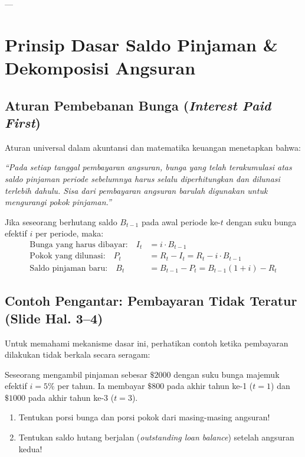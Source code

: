 \documentclass[11pt,a4paper]{article}
\begin{document}
---

\section{Prinsip Dasar Saldo Pinjaman \& Dekomposisi Angsuran}

\subsection{Aturan Pembebanan Bunga (\textit{Interest Paid First})}

Aturan universal dalam akuntansi dan matematika keuangan menetapkan bahwa:
\begin{center}
\textit{``Pada setiap tanggal pembayaran angsuran, bunga yang telah terakumulasi atas saldo pinjaman periode sebelumnya harus selalu diperhitungkan dan dilunasi terlebih dahulu. Sisa dari pembayaran angsuran barulah digunakan untuk mengurangi pokok pinjaman.''}
\end{center}
Jika seseorang berhutang saldo $B_{t-1}$ pada awal periode ke-$t$ dengan suku bunga efektif $i$ per periode, maka:
\begin{align}
    \text{Bunga yang harus dibayar:} \quad I_t &= i \cdot B_{t-1} \\
    \text{Pokok yang dilunasi:} \quad P_t &= R_t - I_t = R_t - i \cdot B_{t-1} \\
    \text{Saldo pinjaman baru:} \quad B_t &= B_{t-1} - P_t = B_{t-1}(1+i) - R_t
\end{align}

\subsection{Contoh Pengantar: Pembayaran Tidak Teratur (Slide Hal. 3--4)}

Untuk memahami mekanisme dasar ini, perhatikan contoh ketika pembayaran dilakukan tidak berkala secara seragam:

\begin{examplebox}
Seseorang mengambil pinjaman sebesar $\$2000$ dengan suku bunga majemuk efektif $i = 5\%$ per tahun. Ia membayar $\$800$ pada akhir tahun ke-1 ($t=1$) dan $\$1000$ pada akhir tahun ke-3 ($t=3$).
\begin{enumerate}[label=(\alph*)]
    \item Tentukan porsi bunga dan porsi pokok dari masing-masing angsuran!
    \item Tentukan saldo hutang berjalan (\textit{outstanding loan balance}) setelah angsuran kedua!
\end{enumerate}
\end{examplebox}
\end{document}
